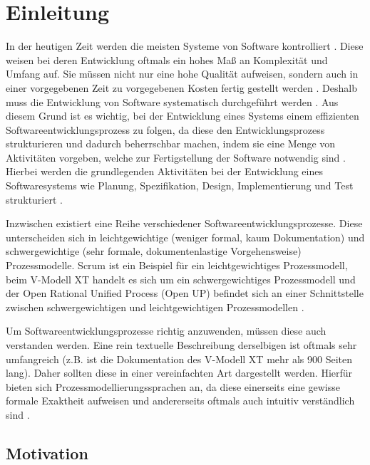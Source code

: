\chapter{Einleitung}\label{sec:chapter1}

In der heutigen Zeit werden die meisten Systeme von Software kontrolliert \cite{Puntambekar2007}. Diese weisen bei deren Entwicklung oftmals ein hohes Maß an Komplexität und Umfang auf. Sie müssen nicht nur eine hohe Qualität aufweisen, sondern auch in einer vorgegebenen Zeit zu vorgegebenen Kosten fertig gestellt werden \cite{Grechenig2010}. Deshalb muss die Entwicklung von Software systematisch durchgeführt werden \cite{gumm2012einführung}. Aus diesem Grund ist es wichtig, bei der Entwicklung eines Systems einem effizienten Softwareentwicklungsprozess zu folgen, da diese den Entwicklungsprozess strukturieren und dadurch beherrschbar machen, indem sie eine Menge von Aktivitäten vorgeben, welche zur Fertigstellung der Software notwendig sind \cite{richling2011autonomie}. Hierbei werden die grundlegenden Aktivitäten bei der Entwicklung eines Softwaresystems wie Planung, Spezifikation, Design, Implementierung und Test strukturiert \cite{gumm2012einführung, hanser2010}. \newline

Inzwischen existiert eine Reihe verschiedener Softwareentwicklungsprozesse. Diese unterscheiden sich in leichtgewichtige (weniger formal, kaum Dokumentation) und schwergewichtige (sehr formale, dokumentenlastige Vorgehensweise) Prozessmodelle. Scrum ist ein Beispiel für ein leichtgewichtiges Prozessmodell, beim V-Modell XT handelt es sich um ein schwergewichtiges Prozessmodell und der Open Rational Unified Process (Open UP) befindet sich an einer Schnittstelle zwischen schwergewichtigen und leichtgewichtigen Prozessmodellen \cite{Hanser2010}.\newline

Um Softwareentwicklungsprozesse richtig anzuwenden, müssen diese auch verstanden werden. Eine rein textuelle Beschreibung derselbigen ist oftmals sehr umfangreich (z.B. ist die Dokumentation des V-Modell XT mehr als 900 Seiten lang). Daher sollten diese in einer vereinfachten Art dargestellt werden. Hierfür bieten sich Prozessmodellierungssprachen an, da diese einerseits eine gewisse formale Exaktheit aufweisen und andererseits oftmals auch intuitiv verständlich sind \cite{thomas2009,kircher2006}. \newline

\section{Motivation}



